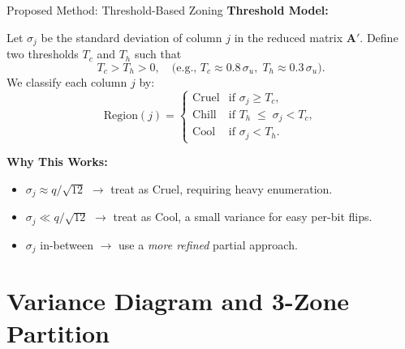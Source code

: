 \documentclass{beamer}
\begin{document}
\begin{frame}{Proposed Method: Threshold-Based Zoning}
  \textbf{Threshold Model:}
  
  Let $\sigma_j$ be the standard deviation of column $j$ in the reduced matrix $\mathbf{A}'$.
  Define two thresholds $T_c$ and $T_h$ such that
  \[
    T_c > T_h > 0, \quad \text{(e.g., }T_c \approx 0.8\,\sigma_u,\; T_h \approx 0.3\,\sigma_u\text{).}
  \]
  We classify each column $j$ by:
  \[
    \text{Region}(j) =
    \begin{cases}
      \mathrm{Cruel} & \text{if } \sigma_j \ge T_c, \\
      \mathrm{Chill} & \text{if } T_h \;\le\;\sigma_j < T_c, \\
      \mathrm{Cool}  & \text{if } \sigma_j < T_h.
    \end{cases}
  \]
  
  \textbf{Why This Works:}
  \begin{itemize}
    \item \(\sigma_j \approx q/\sqrt{12}\) $\rightarrow$ treat as Cruel, requiring heavy enumeration.
    \item \(\sigma_j \ll q/\sqrt{12}\) $\rightarrow$ treat as Cool, a small variance for easy per-bit flips.
    \item \(\sigma_j\) in-between $\rightarrow$ use a \emph{more refined} partial approach.
  \end{itemize}
  \end{frame}

\section{Variance Diagram and 3-Zone Partition}
\end{document}
